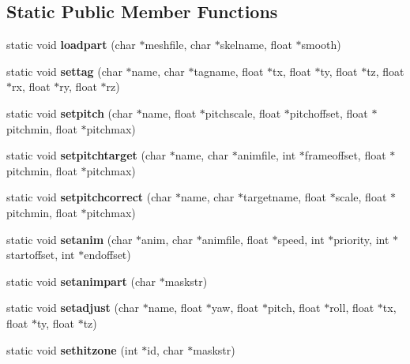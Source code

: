 \subsection*{Static Public Member Functions}
\begin{DoxyCompactItemize}
\item 
\mbox{\label{structskelcommands_a6414e8c7c7413ebf917086869edbe55f}} 
static void {\bfseries loadpart} (char $\ast$meshfile, char $\ast$skelname, float $\ast$smooth)
\item 
\mbox{\label{structskelcommands_aff09f08d2668c0dce73de84a4a069b48}} 
static void {\bfseries settag} (char $\ast$name, char $\ast$tagname, float $\ast$tx, float $\ast$ty, float $\ast$tz, float $\ast$rx, float $\ast$ry, float $\ast$rz)
\item 
\mbox{\label{structskelcommands_a56cbd5546a0d6528cc8b2c48a09ad067}} 
static void {\bfseries setpitch} (char $\ast$name, float $\ast$pitchscale, float $\ast$pitchoffset, float $\ast$pitchmin, float $\ast$pitchmax)
\item 
\mbox{\label{structskelcommands_acf11a6414a5d155760d6d48edecbab5f}} 
static void {\bfseries setpitchtarget} (char $\ast$name, char $\ast$animfile, int $\ast$frameoffset, float $\ast$pitchmin, float $\ast$pitchmax)
\item 
\mbox{\label{structskelcommands_af599285061bb6c986d4323c244e53d9d}} 
static void {\bfseries setpitchcorrect} (char $\ast$name, char $\ast$targetname, float $\ast$scale, float $\ast$pitchmin, float $\ast$pitchmax)
\item 
\mbox{\label{structskelcommands_a72d251f632800125b3f658832995e16a}} 
static void {\bfseries setanim} (char $\ast$anim, char $\ast$animfile, float $\ast$speed, int $\ast$priority, int $\ast$startoffset, int $\ast$endoffset)
\item 
\mbox{\label{structskelcommands_a646221541fe967459983daddab436f44}} 
static void {\bfseries setanimpart} (char $\ast$maskstr)
\item 
\mbox{\label{structskelcommands_ab4b63a25352b18a989b2b83afea48260}} 
static void {\bfseries setadjust} (char $\ast$name, float $\ast$yaw, float $\ast$pitch, float $\ast$roll, float $\ast$tx, float $\ast$ty, float $\ast$tz)
\item 
\mbox{\label{structskelcommands_a4ef3d62da161936cf3ce1825679155c0}} 
static void {\bfseries sethitzone} (int $\ast$id, char $\ast$maskstr)
\end{DoxyCompactItemize}
